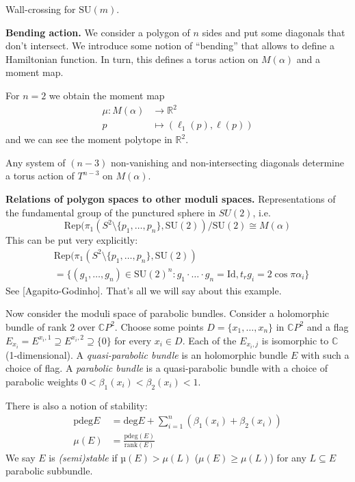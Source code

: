 \begin{theorem}
\label{theorem-Sotillo}
Wall-crossing for $\text{SU}(m)$.
\end{theorem}

\medskip\noindent
{\bf Bending action.}
We consider a polygon of $n$ sides
and put some diagonals that don't intersect.
We introduce some
notion of ``bending'' that allows
to define a Hamiltonian function.
In turn, this defines a torus action on
$M(\alpha)$
and a moment map.

For $n=2$ we obtain the moment map
$$
\begin{aligned}
\mu: M(\alpha) &\longrightarrow \mathbb{R}^2
\\
p &\longmapsto (\ell_1(p),\ell(p))
\end{aligned}
$$
and we can see the moment polytope in
$\mathbb{R}^2$.

\begin{remark}
\label{remark-nonva-nonin-diago}
Any system of $(n-3)$ non-vanishing
and non-intersecting diagonals determine
a torus action of $T^{n-3}$ on $M(\alpha)$.
\end{remark}

\medskip\noindent
{\bf Relations of polygon spaces to other
moduli spaces.}
Representations of the fundamental group
of the punctured sphere in $SU(2)$, i.e.
$$
\text{Rep}(\pi_1(S^2\setminus
\{p_1,\ldots,p_n\},\text{SU}(2))/\text{SU}(2)
\cong
M(\alpha)
$$
This can be put very explicitly:
$$
\begin{aligned}
&\text{Rep}(\pi_1(S^2\setminus
\{p_1,\ldots,p_n\},\text{SU}(2))\\
&=\{(g_1,\ldots,g_n)\in
\text{SU}(2)^n:g_1\cdot\ldots\cdot
g_n=\text{Id},
t_rg_i=2\cos\pi \alpha_i\}
\end{aligned}
$$
See [Agapito-Godinho]. That's all we
will say about this example.

\medskip\noindent
Now consider the moduli space of parabolic
bundles.
Consider a holomorphic bundle of rank 2 over
$\mathbb{C}P^{2}$.
Choose some points $D=\{x_1,\ldots,x_n\}$ in
$\mathbb{C}P^{2}$
and a flag
$E_{x_i}=E^{x_i,1}\supseteq
E^{x_i,2}\supseteq \{0\}$
for every $x_i \in D$. Each of the
$E_{x_i,j}$ is isomorphic to $\mathbb{C}$
(1-dimensional).
A {\it quasi-parabolic bundle}
is an holomorphic bundle $E$
with such a choice of flag.
A {\it parabolic bundle} is a quasi-parabolic
bundle with a choice of parabolic weights
$0< \beta_1(x_i)< \beta_2(x_i)<1$.

There is also a notion of stability:
$$
\begin{aligned}
\text{pdeg}E&=\text{deg}E+ \sum_{i=1}^n
(\beta_1(x_i)+\beta_2(x_i))\\
\mu(E)&=\frac{\text{pdeg}(E)}{\text{rank}(E)}
\end{aligned}
$$
We say $E$ is {\it (semi)stable} if
$µ(E)> \mu(L)$ ($\mu(E) \geq \mu(L)$)
for any $L \subseteq E$ parabolic
subbundle.

